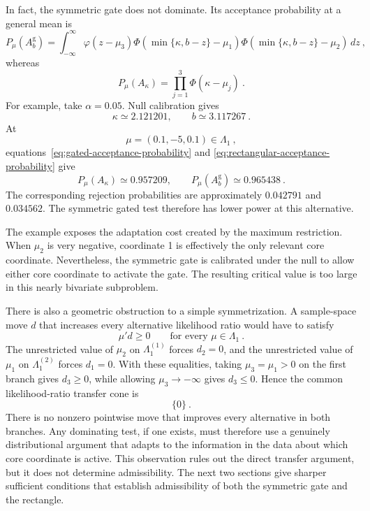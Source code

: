 \documentclass[12pt]{article}
\theoremstyle{remark}
\begin{document}
In fact, the symmetric gate does not dominate.  Its acceptance probability at
a general mean is
\begin{equation}\label{eq:gated-acceptance-probability}
P_\mu(A_b^{\mathrm g})
=
\int_{-\infty}^{\infty}
\varphi(z-\mu_3)
\Phi\!\left(\min\{\kappa,b-z\}-\mu_1\right)
\Phi\!\left(\min\{\kappa,b-z\}-\mu_2\right)
\,dz~,
\end{equation}
whereas
\begin{equation}\label{eq:rectangular-acceptance-probability}
P_\mu(A_\kappa)
=
\prod_{j=1}^3\Phi(\kappa-\mu_j)~.
\end{equation}
For example, take $\alpha=0.05$.  Null calibration gives
\[
\kappa\simeq2.121201,
\qquad
b\simeq3.117267~.
\]
At
\[
\mu=(0.1,-5,0.1)\in\Lambda_1~,
\]
equations~\eqref{eq:gated-acceptance-probability} and
\eqref{eq:rectangular-acceptance-probability} give
\[
P_\mu(A_\kappa)\simeq0.957209,
\qquad
P_\mu(A_b^{\mathrm g})\simeq0.965438~.
\]
The corresponding rejection probabilities are approximately $0.042791$ and
$0.034562$.  The symmetric gated test therefore has lower power at this
alternative.

The example exposes the adaptation cost created by the maximum restriction.
When $\mu_2$ is very negative, coordinate 1 is effectively the only relevant
core coordinate.  Nevertheless, the symmetric gate is calibrated under the
null to allow either core coordinate to activate the gate.  The resulting
critical value is too large in this nearly bivariate subproblem.

There is also a geometric obstruction to a simple symmetrization.  A
sample-space move $d$ that increases every alternative likelihood ratio would
have to satisfy
\[
\mu'd\ge0
\qquad\text{for every }\mu\in\Lambda_1~.
\]
The unrestricted value of $\mu_2$ on $\Lambda_1^{(1)}$ forces $d_2=0$, and
the unrestricted value of $\mu_1$ on $\Lambda_1^{(2)}$ forces $d_1=0$.
With these equalities, taking $\mu_3=\mu_1>0$ on the first branch gives
$d_3\ge0$, while allowing $\mu_3\to-\infty$ gives $d_3\le0$.  Hence the
common likelihood-ratio transfer cone is
\[
\{0\}~.
\]
There is no nonzero pointwise move that improves every alternative in both
branches.  Any dominating test, if one exists, must therefore use a genuinely
distributional argument that adapts to the information in the data about
which core coordinate is active.  This observation rules out the direct
transfer argument, but it does not determine admissibility.  The next two
sections give sharper sufficient conditions that establish admissibility of
both the symmetric gate and the rectangle.
\end{document}
